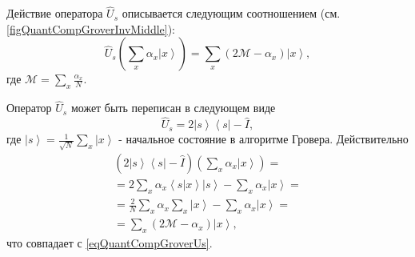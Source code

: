 

Действие оператора $\hat{U}_s$ описывается следующим соотношением
(см. \autoref{figQuantCompGroverInvMiddle}):
\begin{equation}
\hat{U}_s\left(\sum_x \alpha_x \left|x\right>\right) = 
\sum_x \left(2 \mathcal{M} - \alpha_x \right)\left|x\right>,
\label{eqQuantCompGroverUs}
\end{equation} 
где $\mathcal{M} = \sum_x \frac{\alpha_x}{N}$.

Оператор $\hat{U}_s$ может быть переписан в следующем виде
\begin{equation}
\hat{U}_s = 
2 \left|s\right>\left<s\right| - \hat{I},
\nonumber
\end{equation}
где $\left|s\right>=\frac{1}{\sqrt{N}}\sum_x \left|x\right>$ -
начальное состояние в алгоритме Гровера.
Действительно
\begin{eqnarray}
\left(2 \left|s\right>\left<s\right| - \hat{I}\right)
\left(\sum_x \alpha_x \left|x\right>\right) =
\nonumber \\
=  2 \sum_x \alpha_x \left<s\right.\left|x\right> \left|s\right> 
- \sum_x \alpha_x \left|x\right> = 
\nonumber \\
=
\frac{2}{N} \sum_x \alpha_x \sum_x \left|x\right> -
\sum_x \alpha_x \left|x\right> = 
\nonumber \\
= \sum_x \left( 2 \mathcal{M} -\alpha_x \right) \left|x\right>,
\nonumber
\end{eqnarray}
что совпадает с \eqref{eqQuantCompGroverUs}.




